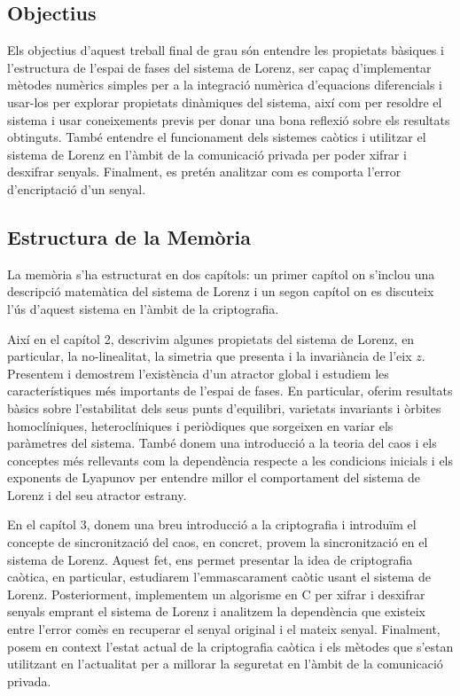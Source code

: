 \documentclass[11pt,a4paper,openright,oneside]{article}
\numberwithin{equation}{section}
\theoremstyle{definition}
\begin{document}
\subsection{Objectius}

Els objectius d'aquest treball final de grau són entendre les propietats bàsiques i l'estructura de l'espai de fases del sistema de Lorenz, ser capaç d'implementar mètodes numèrics simples per a la integració numèrica d'equacions diferencials i usar-los per explorar propietats dinàmiques del sistema, així com per resoldre el sistema i usar coneixements previs per donar una bona reflexió sobre els resultats obtinguts. També entendre el funcionament dels sistemes caòtics i utilitzar el sistema de Lorenz en l'àmbit de la comunicació privada per poder xifrar i desxifrar senyals. Finalment, es pretén analitzar com es comporta l'error d'encriptació d'un senyal.

\subsection{Estructura de la Mem\`oria}

La memòria s'ha estructurat en dos capítols: un primer capítol on s'inclou una descripció matemàtica del sistema de Lorenz i un segon capítol on es discuteix l'ús d'aquest sistema en l'àmbit de la criptografia. 

Així en el capítol 2, descrivim algunes propietats del sistema de Lorenz, en particular, la no-linealitat, la simetria que presenta i la invariància de l'eix $z$. Presentem i demostrem l'existència d'un atractor global i estudiem les característiques més importants de l'espai de fases. En particular, oferim resultats bàsics sobre l'estabilitat dels seus punts d'equilibri, varietats invariants i òrbites homoclíniques, heteroclíniques i periòdiques que sorgeixen en variar els paràmetres del sistema. També donem una introducció a la teoria del caos i els conceptes més rellevants com la dependència respecte a les condicions inicials i els exponents de Lyapunov per entendre millor el comportament del sistema de Lorenz i del seu atractor estrany.

En el capítol 3, donem una breu introducció a la criptografia i introduïm el concepte de sincronització del caos, en concret, provem la sincronització en el sistema de Lorenz. Aquest fet, ens permet presentar la idea de criptografia caòtica, en particular, estudiarem l'emmascarament caòtic usant el sistema de Lorenz. Posteriorment, implementem un algorisme en C per xifrar i desxifrar senyals emprant el sistema de Lorenz i analitzem la dependència que existeix entre l'error comès en recuperar el senyal original i el mateix senyal. Finalment, posem en context l'estat actual de la criptografia caòtica i els mètodes que s'estan utilitzant en l'actualitat per a millorar la seguretat en l'àmbit de la comunicació privada.
\end{document}
